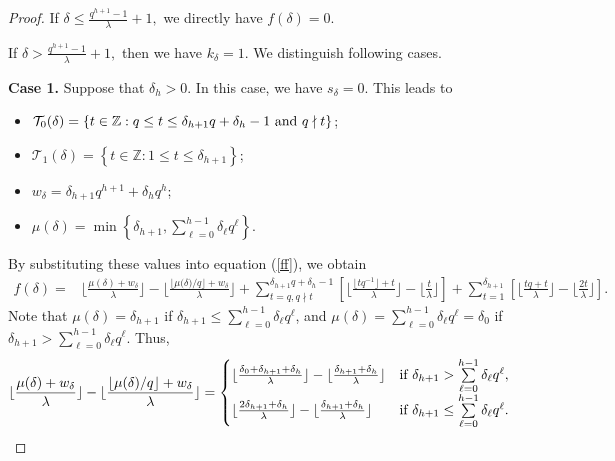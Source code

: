 \documentclass[journal,onecolumn]{IEEEtran}
\begin{document}
\begin{proof}
   If  $\delta \leq \frac{q^{h+1}-1}{\lambda}+1, $ we  directly have $f(\delta)=0$. 
   
     If  $\delta >\frac{q^{h+1}-1}{\lambda}+1, $ then we have $k_{\delta}=1$.  We distinguish following cases. 

 \textbf{Case 1.} Suppose that $\delta_h>0$.  In this case, we have $s_{\delta}=0$. This leads to  
 \begin{itemize}
     \item $\mathcal{T}_0(\delta)=\left\{t\in \mathbb{Z}: q\leq  t\leq  \delta_{h+1}q+ \delta_h-1\hbox{ and }q\nmid t\right\}$; 
     \item 
     $\mathcal{T}_1(\delta)=\left\{t\in \mathbb{Z}:1 \leq t \leq \delta_{h+1}\right\}$;
     \item $w_{\delta}=\delta_{h+1}q^{h+1}+\delta_hq^h$;
      \item  $\mu(\delta)=\min\left\{\delta_{h+1},\sum\limits_{\ell=0}^{h-1}\delta_{\ell}q^{\ell}\right\}$.
      \end{itemize}
     By substituting these values into equation (\ref{ff}), we obtain  
\begin{equation}\label{cor3e1} 
\begin{split}
f(\delta)=&\lfloor \frac{\mu(\delta)+w_{\delta}}{\lambda}\rfloor - \lfloor \frac{{\lfloor \mu(\delta})/q\rfloor+w_{\delta}}{\lambda}\rfloor  + \sum\limits_{t=q, q\nmid t}^{\delta_{h+1}q+\delta_{h}-1}\left[ \lfloor\frac{\lfloor tq^{-1}\rfloor+t}{\lambda}\rfloor - \lfloor\frac{t}{\lambda}\rfloor\right]+ \sum\limits_{t=1}^{\delta_{h+1}}\left[ \lfloor\frac{ tq+t}{\lambda}\rfloor - \lfloor\frac{2t}{\lambda}\rfloor\right]. 
\end{split}
\end{equation} 
Note that  $\mu(\delta)=\delta_{h+1}$  if $\delta_{h+1}\leq \sum\limits_{\ell=0}^{h-1}\delta_{\ell}q^{\ell}$, and $\mu(\delta)=\sum\limits_{\ell=0}^{h-1}\delta_{\ell}q^{\ell}=\delta_0$ if  $\delta_{h+1}> \sum\limits_{\ell=0}^{h-1}\delta_{\ell}q^{\ell}$.  Thus, 
\begin{equation}\label{588}
    \lfloor \frac{\mu(\delta)+w_{\delta}}{\lambda}\rfloor - \lfloor \frac{{\lfloor \mu(\delta})/q\rfloor+w_{\delta}}{\lambda}\rfloor =\begin{cases}
\lfloor\frac{\delta_0+\delta_{h+1}+\delta_h}{\lambda} \rfloor - \lfloor\frac{\delta_{h+1}+\delta_h}{\lambda} \rfloor& \hbox{if } \delta_{h+1}> \sum\limits_{\ell=0}^{h-1}\delta_{\ell}q^{\ell},\\
 \lfloor\frac{2\delta_{h+1}+\delta_h}{\lambda} \rfloor - \lfloor\frac{\delta_{h+1}+\delta_h}{\lambda} \rfloor  & \hbox{if } \delta_{h+1}\leq \sum\limits_{\ell=0}^{h-1}\delta_{\ell}q^{\ell}.

\end{cases}
\end{equation}
\end{proof}
\end{document}
